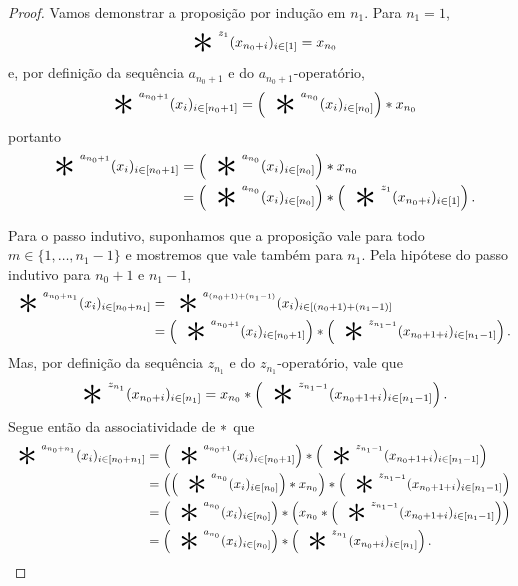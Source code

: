 \begin{proof}
Vamos demonstrar a proposição por indução em $n_1$. Para $n_1=1$,
	\begin{equation*}
	\bigopb\nolimits^{z_{1}} (x_{n_0+i})_{i \in [1]} = x_{n_0}
	\end{equation*}
e, por definição da sequência $a_{n_0+1}$ e do $a_{n_0+1}$-operatório,
	\begin{equation*}
	\bigopb\nolimits^{a_{n_0+1}} (x_i)_{i \in [n_0+1]} = \left( \bigopb\nolimits^{a_{n_0}} (x_i)_{i \in [n_0]} \right) \opb x_{n_0}
	\end{equation*}
portanto
	\begin{align*}
	\bigopb\nolimits^{a_{n_0+1}} (x_i)_{i \in [n_0+1]} &= \left( \bigopb\nolimits^{a_{n_0}} (x_i)_{i \in [n_0]} \right) \opb x_{n_0} \\
		&= \left( \bigopb\nolimits^{a_{n_0}} (x_i)_{i \in [n_0]} \right) \opb \left( \bigopb\nolimits^{z_{1}} (x_{n_0+i})_{i \in [1]} \right).
	\end{align*}

Para o passo indutivo, suponhamos que a proposição vale para todo $m \in \{1,\ldots, n_1-1\}$ e mostremos que vale também para $n_1$. Pela hipótese do passo indutivo para $n_0+1$ e $n_1-1$,
	\begin{align*}
	\bigopb\nolimits^{a_{n_0+n_1}} (x_i)_{i \in [n_0+n_1]} &= \bigopb\nolimits^{a_{(n_0+1)+(n_1-1)}} (x_i)_{i \in [(n_0+1)+(n_1-1)]} \\
		&= \left( \bigopb\nolimits^{a_{n_0+1}} (x_i)_{i \in [n_0+1]} \right) \opb \left( \bigopb\nolimits^{z_{n_1-1}} (x_{n_0+1+i})_{i \in [n_1-1]} \right).
	\end{align*}
Mas, por definição da sequência $z_{n_1}$ e do $z_{n_1}$-operatório, vale que
	\begin{equation*}
	\bigopb\nolimits^{z_{n_1}} (x_{n_0+i})_{i \in [n_1]} = x_{n_0} \opb \left( \bigopb\nolimits^{z_{n_1-1}} (x_{n_0+1+i})_{i \in [n_1-1]} \right).
	\end{equation*}
Segue então da associatividade de $\ast$ que
	\begin{align*}
	\bigopb\nolimits^{a_{n_0+n_1}} (x_i)_{i \in [n_0+n_1]} &= \left( \bigopb\nolimits^{a_{n_0+1}} (x_i)_{i \in [n_0+1]} \right) \opb \left( \bigopb\nolimits^{z_{n_1-1}} (x_{n_0+1+i})_{i \in [n_1-1]} \right) \\
		&= \left( \left( \bigopb\nolimits^{a_{n_0}} (x_i)_{i \in [n_0]} \right) \opb x_{n_0} \right) \opb \left( \bigopb\nolimits^{z_{n_1-1}} (x_{n_0+1+i})_{i \in [n_1-1]} \right) \\
		&= \left( \bigopb\nolimits^{a_{n_0}} (x_i)_{i \in [n_0]} \right) \opb \left( x_{n_0} \opb \left( \bigopb\nolimits^{z_{n_1-1}} (x_{n_0+1+i})_{i \in [n_1-1]} \right) \right) \\
		&= \left( \bigopb\nolimits^{a_{n_0}} (x_i)_{i \in [n_0]} \right) \opb \left( \bigopb\nolimits^{z_{n_1}} (x_{n_0+i})_{i \in [n_1]} \right).
		\qedhere
	\end{align*}
\end{proof}

